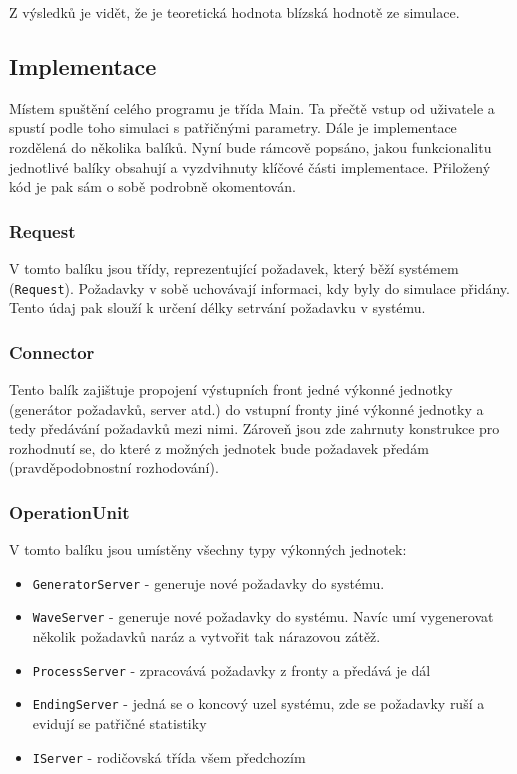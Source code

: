 \documentclass{article}
\begin{document}
Z výsledků je vidět, že je teoretická hodnota blízská hodnotě ze simulace.


\subsection{Implementace}
Místem spuštění celého programu je třída Main. 
Ta přečtě vstup od uživatele a spustí podle toho simulaci s patřičnými parametry.
Dále je implementace rozdělená do několika balíků. 
Nyní bude rámcově popsáno, jakou funkcionalitu jednotlivé balíky obsahují a vyzdvihnuty klíčové části implementace.
Přiložený kód je pak sám o sobě podrobně okomentován.

\subsubsection{Request}
V tomto balíku jsou třídy, reprezentující požadavek, který běží systémem (\texttt{Request}). 
Požadavky v sobě uchovávají informaci, kdy byly do simulace přidány. 
Tento údaj pak slouží k určení délky setrvání požadavku v systému.

\subsubsection{Connector}
Tento balík zajištuje propojení výstupních front jedné výkonné jednotky (generátor požadavků, server atd.) do vstupní fronty jiné výkonné jednotky a tedy předávání požadavků mezi nimi.
Zároveň jsou zde zahrnuty konstrukce pro rozhodnutí se, do které z možných jednotek bude požadavek předám (pravděpodobnostní rozhodování).

\subsubsection{OperationUnit}
V tomto balíku jsou umístěny všechny typy výkonných jednotek:

\begin{itemize}  
\item \texttt{GeneratorServer} - generuje nové požadavky do systému.
\item \texttt{WaveServer} - generuje nové požadavky do systému. Navíc umí vygenerovat několik požadavků naráz a vytvořit tak nárazovou zátěž.
\item \texttt{ProcessServer} - zpracovává požadavky z fronty a předává je dál
\item \texttt{EndingServer} - jedná se o koncový uzel systému, zde se požadavky ruší a evidují se patřičné statistiky
\item \texttt{IServer} - rodičovská třída všem předchozím
\end{itemize}
\end{document}
